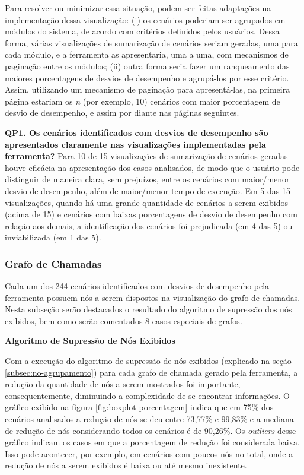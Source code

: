 Para resolver ou minimizar essa situação, podem ser feitas adaptações na implementação dessa visualização: (i) os cenários poderiam ser agrupados em módulos do sistema, de acordo com critérios definidos pelos usuários. Dessa forma, várias visualizações de sumarização de cenários seriam geradas, uma para cada módulo, e a ferramenta as apresentaria, uma a uma, com mecanismos de paginação entre os módulos; (ii) outra forma seria fazer um ranqueamento das maiores porcentagens de desvios de desempenho e agrupá-los por esse critério. Assim, utilizando um mecanismo de paginação para apresentá-las, na primeira página estariam os \textit{n} (por exemplo, 10) cenários com maior porcentagem de desvio de desempenho, e assim por diante nas páginas seguintes.

\begin{framed}
  \noindent \textbf{QP1. Os cenários identificados com desvios de desempenho são apresentados claramente nas visualizações implementadas pela ferramenta?} Para 10 de 15 visualizações de sumarização de cenários geradas houve eficácia na apresentação dos casos analisados, de modo que o usuário pode distinguir de maneira clara, sem prejuízos, entre os cenários com maior/menor desvio de desempenho, além de maior/menor tempo de execução. Em 5 das 15 visualizações, quando há uma grande quantidade de cenários a serem exibidos (acima de 15) e cenários com baixas porcentagens de desvio de desempenho com relação aos demais, a identificação dos cenários foi prejudicada (em 4 das 5) ou inviabilizada (em 1 das 5).
\end{framed}

\subsubsection{Grafo de Chamadas} \label{subsec:avaliacao-comportamento-grafo-chamadas}

Cada um dos 244 cenários identificados com desvios de desempenho pela ferramenta possuem nós a serem dispostos na visualização do grafo de chamadas. Nesta subseção serão destacados o resultado do algoritmo de supressão dos nós exibidos, bem como serão comentados 8 casos especiais de grafos.

\noindent \textbf{Algoritmo de Supressão de Nós Exibidos}

Com a execução do algoritmo de supressão de nós exibidos (explicado na seção \ref{subsec:no-agrupamento}) para cada grafo de chamada gerado pela ferramenta, a redução da quantidade de nós a serem mostrados foi importante, consequentemente, diminuindo a complexidade de se encontrar informações. O gráfico exibido na figura \ref{fig:boxplot-porcentagem} indica que em 75\% dos cenários analisados a redução de nós se deu entre 73,77\% e 99,83\% e a mediana de redução de nós considerando todos os cenários é de 90,26\%. Os \textit{outliers} desse gráfico indicam os casos em que a porcentagem de redução foi considerada baixa. Isso pode acontecer, por exemplo, em cenários com poucos nós no total, onde a redução de nós a serem exibidos é baixa ou até mesmo inexistente.

